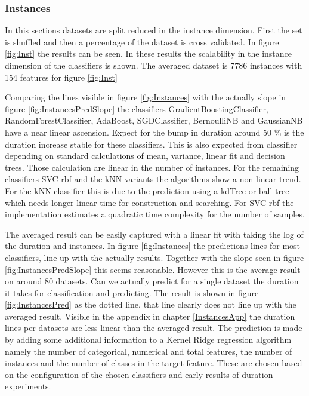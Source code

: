\documentclass[a4paper,10pt]{article}
\begin{document}
\newpage
\subsubsection{Instances}
In this sections datasets are split reduced in the instance dimension. First the set is shuffled and then a percentage of the dataset is cross validated. In figure \ref{fig:Inst} the results can be seen. In these results the scalability in the instance dimension of the classifiers is shown. The averaged dataset is 7786 instances with 154 features for figure \ref{fig:Inst} 

Comparing the lines visible in figure \ref{fig:Instances} with the actually slope in figure \ref{fig:InstancesPredSlope} the classifiers GradientBoostingClassifier, RandomForestClassifier, AdaBoost, SGDClassifier, BernoulliNB and GaussianNB have a near linear ascension. Expect for the bump in duration around 50 $\%$ is the duration increase stable for these classifiers. This is also expected from classifier depending on standard calculations of mean, variance, linear fit and decision trees. Those calculation are linear in the number of instances. For the remaining classifiers SVC-rbf and the kNN variants the algorithms show a non linear trend. For the kNN classifier this is due to the prediction using a kdTree or ball tree which needs longer linear time for construction and searching. For SVC-rbf the implementation estimates a quadratic time complexity for the number of samples. 

The averaged result can be easily captured with a linear fit with taking the log of the duration and instances. In figure \ref{fig:Instances} the predictions lines for most classifiers, line up with the actually results. Together with the slope seen in figure \ref{fig:InstancesPredSlope} this seems reasonable. However this is the average result on around 80 datasets. Can we actually predict for a single dataset the duration it takes for classification and predicting. The result is shown in figure \ref{fig:InstancesPred} as the dotted line, that line clearly does not line up with the averaged result. Visible in the appendix in chapter \ref{InstancesApp} the duration lines per datasets are less linear than the averaged result. The prediction is made by adding some additional information to a Kernel Ridge regression algorithm namely the number of categorical, numerical and total features, the number of instances and the number of classes in the target feature. These are chosen based on the configuration of the chosen classifiers and early results of duration experiments. 
\end{document}
